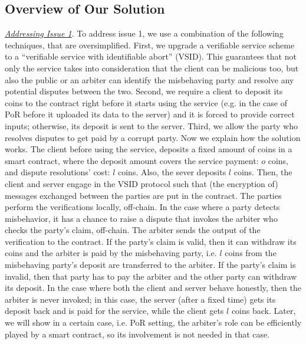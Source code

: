 
\subsection{Overview of Our Solution}

\noindent\underline{\textit{Addressing Issue 1}}. To address issue 1, we use a combination of the following techniques, that are oversimplified.  First, we upgrade a verifiable service scheme to a ``verifiable service with identifiable abort'' (VSID). This guarantees that not only the service  takes into  consideration that the client can  be malicious too, but also the public or an arbiter can identify the misbehaving party and resolve any potential disputes between the two. Second, we require a client to deposit its coins to the contract right before it starts using the service (e.g. in the case of PoR before it uploaded its data to the server) and it is forced to provide correct inputs; otherwise, its deposit is sent to the server.  Third, we allow the party who resolves disputes to get paid by a corrupt party. Now we explain how the solution works. The client before using the service, deposits  a fixed amount of coins in a smart contract, where the deposit amount covers the service payment: $o$ coins, and dispute resolutions' cost: $l$ coins. Also, the sever deposits  $l$ coins. Then, the client and server  engage in the   VSID protocol such that (the encryption of)  messages exchanged between the parties are put in the contract.  The parties perform the verifications locally, off-chain.  In the case where a party detects misbehavior, it  has a chance to raise a dispute that invokes the arbiter who  checks the party's claim, off-chain. The arbiter sends the output of the verification to the contract. If the party's claim is  valid, then it can withdraw its coins and the arbiter is paid by the misbehaving party, i.e. $l$ coins from the misbehaving party's deposit are transferred to the arbiter.  If the party's claim is invalid, then that party has to pay the arbiter and the other party can withdraw its deposit. In the case where both the client and server behave honestly, then the arbiter is never invoked;  in this case, the server (after a fixed time) gets its deposit back and is paid for the service, while  the client gets $l$ coins back.  Later, we will show in a certain case, i.e. PoR setting, the arbiter's role can be efficiently played by a smart contract, so its involvement is not needed in that case. 

\

